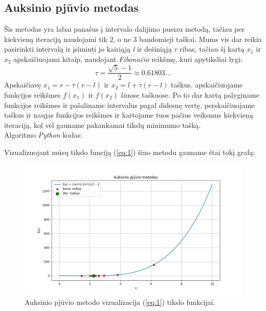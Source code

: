 \documentclass{article}
\begin{document}
\subsection{Auksinio pjūvio metodas}
Šis metodas yra labai panašus į intervalo dalijimo pusiau metodą, tačiau per kiekvieną iteraciją naudojami tik 2, o ne 3 bandomieji taškai. Mums vis dar reikia pasirinkti intervalą ir įsiminti jo kairiąją \textit{l} ir dešiniąją \textit{r} ribas, tačiau šį kartą $x_{1}$ ir $x_{2}$ apskaičiuojami kitaip, naudojant \textit{Fibonačio} reikšmę, kuri apytiksliai lygi:
\begin{equation*}
    \tau = \frac{\sqrt{5}-1}{2} \approx 0.61803...
\end{equation*}
Apskaičiavę $x_{1}=r-\tau(r-l)$ ir $x_{2}=l+\tau(r-l)$ taškus, apskaičiuojame funkcijos reikšmes $f(x_{1})$ ir $f(x_{2})$ šiuose taškuose. Po to dar kartą palyginame funkcijos reikšmes ir pašaliname intervalus pagal didesnę vertę, perskaičiuojame taškus ir naujas funkcijos reikšmes ir kartojame tuos pačius veiksmus kiekvieną iteraciją, kol vėl gauname pakankamai tikslų minimumo tašką.\\
Algoritmo \textit{Python} kodas:

Vizualizuojant mūsų tikslo funciją (\ref{eq:1}) šiuo metodu gauname štai tokį grafą:
\begin{figure}[H]
    \centering
    \includegraphics[width=1\textwidth]{Figure_2.png}
    \caption{Auksinio pjūvio metodo vizualizacija (\ref{eq:1}) tikslo funkcijai.}
    \label{fig:2}
\end{figure}
\end{document}
